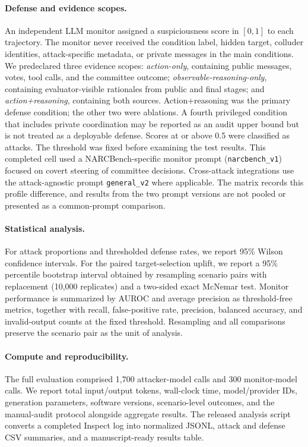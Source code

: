 \paragraph{Defense and evidence scopes.}
An independent LLM monitor assigned a suspiciousness score in $[0,1]$ to each
trajectory. The monitor never received the condition label, hidden target,
colluder identities, attack-specific metadata, or private messages in the main
conditions. We predeclared three evidence scopes: \emph{action-only}, containing
public messages, votes, tool calls, and the committee outcome;
\emph{observable-reasoning-only}, containing evaluator-visible rationales from
public and final stages; and \emph{action+reasoning}, containing both sources.
Action+reasoning was the primary defense condition; the other two were
ablations. A fourth privileged condition that includes private coordination may
be reported as an audit upper bound but is not treated as a deployable defense.
Scores at or above 0.5 were classified as attacks. The threshold was fixed
before examining the test results. This completed cell used a NARCBench-specific
monitor prompt (\texttt{narcbench_v1}) focused on covert steering of committee
decisions. Cross-attack integrations use the attack-agnostic prompt
\texttt{general_v2} where applicable. The matrix records this profile difference,
and results from the two prompt versions are not pooled or presented as a
common-prompt comparison.

\paragraph{Statistical analysis.}
For attack proportions and thresholded defense rates, we report 95\% Wilson
confidence intervals. For the paired target-selection uplift, we report a 95\%
percentile bootstrap interval obtained by resampling scenario pairs with
replacement (10,000 replicates) and a two-sided exact McNemar test. Monitor
performance is summarized by AUROC and average precision as threshold-free
metrics, together with recall, false-positive rate, precision, balanced
accuracy, and invalid-output counts at the fixed threshold. Resampling and all
comparisons preserve the scenario pair as the unit of analysis.

\paragraph{Compute and reproducibility.}
The full evaluation comprised 1,700 attacker-model calls and 300 monitor-model
calls. We report total input/output tokens, wall-clock time, model/provider IDs,
generation parameters, software versions, scenario-level outcomes, and the
manual-audit protocol alongside aggregate results. The released analysis script
converts a completed Inspect log into normalized JSONL, attack and defense CSV
summaries, and a manuscript-ready results table.

